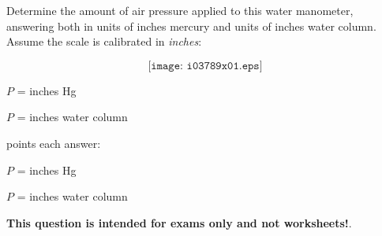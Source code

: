 

Determine the amount of air pressure applied to this water manometer, answering both in units of inches mercury and units of inches water column.  Assume the scale is calibrated in {\it inches}:

$$\texttt{[image: i03789x01.eps]}$$

$P$ = \underbar{\hskip 50pt} inches Hg

\vskip 10pt

$P$ = \underbar{\hskip 50pt} inches water column







 points each answer:

\vskip 10pt

$P$ =  inches Hg

\vskip 10pt

$P$ =  inches water column







{\bf This question is intended for exams only and not worksheets!}.



